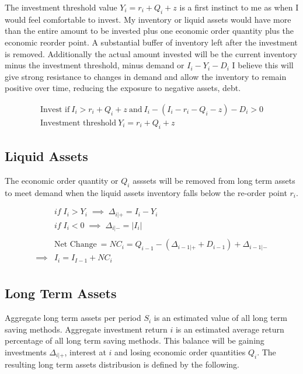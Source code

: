 \documentclass{article}
\begin{document}
The investment threshold value  $Y_{i} =  r_{i} + Q_{i} + z$  is a first instinct to me as when I would feel comfortable to invest. My inventory or liquid assets would have more than the entire amount to be invested plus one economic order quantity plus the economic reorder point. A substantial buffer of inventory left after the investment is removed. Additionally the actual amount invested will be the current inventory minus the investment threshold, minus demand or $I_{i} - Y_{i} - D_{i}$  I believe this will give strong resistance to changes in demand and allow the inventory to remain positive over time, reducing the exposure to negative assets, debt. 

\begin{equation}
	\begin{split}
		\text{Invest if} \: I_{i} > r_{i} + Q_{i} + z \:\text{and} \: I_{i} - ( I_{i} - r_{i} - Q_{i} - z) - D_{i} > 0 \\
		\text{Investment threshold} \: Y_{i} =  r_{i} + Q_{i} + z 
	\end{split}
\end{equation}

\subsection{Liquid Assets}
The economic order quantity or $Q_{i}$  asssets will be removed from long term assets to meet demand when the liquid assets inventory falls below the re-order point $r_{i}$.

\begin{align*}
	& if \; I_{i} > Y_{i} \;\implies\;	 \Delta_{i|+} = I_{i} - Y_{i}\\
	& if \; I_{i} < 0 \;\implies\; 	 \Delta_{i|-} = |I_{i}|\\ 
	\\
	& \text{Net Change} \: = NC_{i}= Q_{i-1} -( \Delta_{i-1|+} + D_{i-1})+\Delta_{i-1|-}\\
										\implies & I_{i} = I_{I-1} + NC_{i}\\
\end{align*}

\subsection{Long Term Assets}
Aggregate long term assets per period $S_{i}$ is an estimated value of all long term saving methods. Aggregate investment return $i$ is an estimated average return percentage of all long term saving methods.  This balance will be gaining investments $\Delta_{i|+}$, interest at $i$ and losing economic order quantities $Q_{i}$. The resulting long term assets distribusion is defined by the following. 
\end{document}
